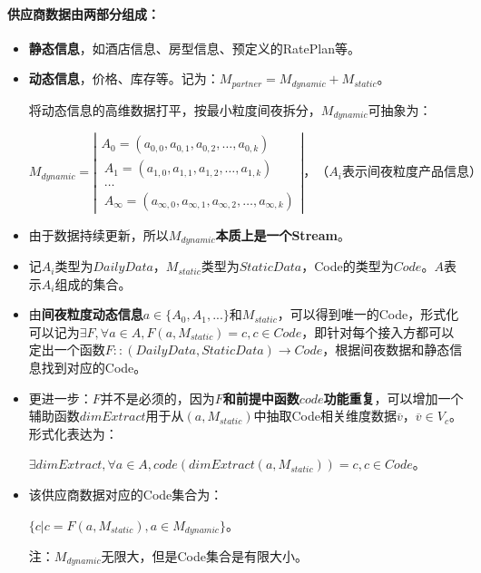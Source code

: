 \documentclass[a4paper]{article}
\begin{document}
\paragraph{供应商数据由两部分组成：}
\begin{itemize}
\item \textbf{静态信息}，如酒店信息、房型信息、预定义的RatePlan等。
\item \textbf{动态信息}，价格、库存等。记为：$M_{partner}=M_{dynamic}+M_{static}$。

将动态信息的高维数据打平，按最小粒度间夜拆分，$M_{dynamic}$可抽象为：
\begin{center}
$M_{dynamic}=\left|\begin{array}{ccc}
A_0=(a_{0,0},a_{0,1},a_{0,2}, \dots, a_{0,k}) \\\
A_1=(a_{1,0},a_{1,1},a_{1,2}, \dots, a_{1,k}) \\\
\dots \\\
A_{\infty}=(a_{\infty,0},a_{\infty,1},a_{\infty,2},\dots,a_{\infty,k}) 
\end{array} \right|，（A_i表示间夜粒度产品信息）$
\end{center}
\item 由于数据持续更新，所以\textbf{$M_{dynamic}$本质上是一个Stream}。
\item 记$A_i$类型为$DailyData$，$M_{static}$类型为$StaticData$，Code的类型为$Code$。$A$表示$A_i$组成的集合。
\item 由\textbf{间夜粒度动态信息}$a\in \{A_0,A_1,...\}$和$M_{static}$，可以得到唯一的Code，形式化可以记为$\exists F,  \forall a \in A, F(a,M_{static}) = c ,  c\in Code$，即针对每个接入方都可以定出一个函数$F::(DailyData, StaticData) \to Code$，根据间夜数据和静态信息找到对应的Code。
\item 更进一步：$F$并不是必须的，因为\textbf{$F$和前提中函数$code$功能重复}，可以增加一个辅助函数$dimExtract$用于从$(a, M_{static})$中抽取Code相关维度数据$\overline v，\overline v \in V_c$。形式化表达为：
\begin{center}
    $\exists dimExtract,  \forall a \in A, code(dimExtract(a,M_{static})) = c ,  c\in Code$。
\end{center}
\item 该供应商数据对应的Code集合为：
\begin{center}
    $\{ c | c = F(a, M_{static}), a \in M_{dynamic}\}$。
\end{center}
注：$M_{dynamic}$无限大，但是Code集合是有限大小。
\end{itemize}
\end{document}
